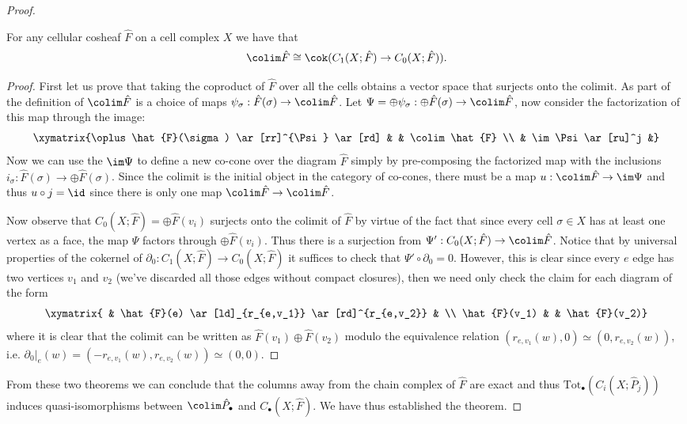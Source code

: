 \begin{proof}
\begin{lem}
 For any cellular cosheaf $\hat{F}$ on a cell complex $X$ we have that $$\colim \hat{F}\cong\cok(C_1(X;\hat{F})\to C_0(X;\hat{F})).$$
\end{lem}
\begin{proof}
 First let us prove that taking the coproduct of $\hat{F}$ over all the cells obtains a vector space that surjects onto the colimit. As part of the definition of $\colim \hat{F}$ is a choice of maps $\psi_{\sigma}:\hat{F}(\sigma)\to\colim \hat{F}$.  Let $\Psi=\oplus \psi_{\sigma}:\oplus \hat{F}(\sigma)\to \colim \hat{F}$, now consider the factorization of this map through the image:
\[
 \xymatrix{\oplus \hat{F}(\sigma) \ar[rr]^{\Psi} \ar[rd] & & \colim \hat{F} \\
& \im \Psi \ar[ru]^j &}
\]
Now we can use the $\im \Psi$ to define a new co-cone over the diagram $\hat{F}$ simply by pre-composing the factorized map with the inclusions $i_{\sigma}:\hat{F}(\sigma)\to\oplus \hat{F}(\sigma)$. Since the colimit is the initial object in the category of co-cones, there must be a map $u:\colim \hat{F}\to \im \Psi$ and thus $u\circ j=\id$ since there is only one map $\colim\hat{F}\to\colim\hat{F}$.

Now observe that $C_0(X;\hat{F})=\oplus \hat{F}(v_i)$ surjects onto the colimit of $\hat{F}$ by virtue of the fact that since every cell $\sigma\in X$ has at least one vertex as a face, the map $\Psi$ factors through $\oplus \hat{F}(v_i)$. Thus there is a surjection from $\Psi':C_0(X;\hat{F})\to \colim\hat{F}$. Notice that by universal properties of the cokernel of $\partial_0:C_1(X;\hat{F})\to C_0(X;\hat{F})$ it suffices to check that $\Psi'\circ\partial_0=0$. However, this is clear since every $e$ edge has two vertices $v_1$ and $v_2$ (we've discarded all those edges without compact closures), then we need only check the claim for each diagram of the form
\[
 \xymatrix{ & \hat{F}(e) \ar[ld]_{r_{e,v_1}} \ar[rd]^{r_{e,v_2}} & \\
\hat{F}(v_1) & & \hat{F}(v_2)}
\]
where it is clear that the colimit can be written as $\hat{F}(v_1)\oplus \hat{F}(v_2)$ modulo the equivalence relation $(r_{e,v_1}(w),0)\simeq (0,r_{e,v_2}(w))$, i.e. $\partial_0|_e(w)=(-r_{e,v_1}(w),r_{e,v_2}(w))\simeq(0,0)$.
\end{proof}

From these two theorems we can conclude that the columns away from the chain complex of $\hat{F}$ are exact and thus $\mathrm{Tot}_{\bullet}(C_i(X;\hat{P}_j))$ induces quasi-isomorphisms between $\colim \hat{P}_{\bullet}$ and $C_{\bullet}(X;\hat{F})$. We have thus established the theorem.
\end{proof}

